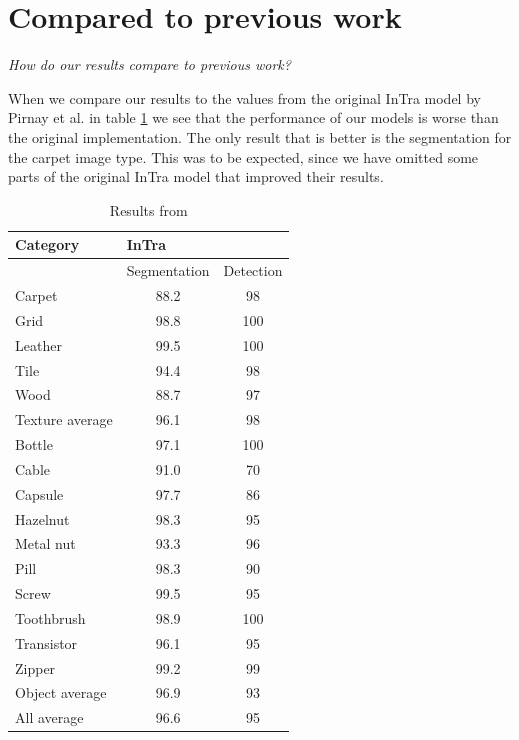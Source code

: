 \section{Compared to previous work}

\textit{How do our results compare to previous work?}

When we compare our results to the values from the original InTra model by Pirnay et al. \cite{pirnay_inpainting_2021} in table \ref{table:results:pirnay} we see that the performance of our models is worse than the original implementation. The only result that is better is the segmentation for the carpet image type. This was to be expected, since we have omitted some parts of the original InTra model that improved their results.

\begin{table}
\centering
\begin{tabular}{l|cc} 
\toprule
Category        & \multicolumn{2}{l}{InTra}    \\ 
\midrule
                & Segmentation & Detection    \\ 
\midrule
Carpet          & 88.2         & 98           \\
Grid            & 98.8         & 100          \\
Leather         & 99.5         & 100          \\
Tile            & 94.4         & 98           \\
Wood            & 88.7         & 97          \\ 
\midrule
Texture average & 96.1         & 98           \\ 
\midrule
Bottle          & 97.1         & 100          \\
Cable           & 91.0         & 70           \\
Capsule         & 97.7         & 86           \\
Hazelnut        & 98.3         & 95         \\
Metal nut       & 93.3         & 96          \\
Pill            & 98.3         & 90          \\
Screw           & 99.5         & 95          \\
Toothbrush      & 98.9         & 100         \\
Transistor      & 96.1         & 95          \\
Zipper          & 99.2         & 99          \\ 
\midrule
Object average  & 96.9         & 93          \\ 
\midrule
All average     & 96.6         & 95          \\
\bottomrule
\end{tabular}
\label{table:results:pirnay}
\caption{Results from \cite{pirnay_inpainting_2021}}
\end{table}

